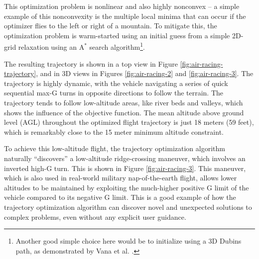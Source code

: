 This optimization problem is nonlinear and also highly nonconvex -- a simple example of this nonconvexity is the multiple local minima that can occur if the optimizer flies to the left or right of a mountain. To mitigate this, the optimization problem is warm-started using an initial guess from a simple 2D-grid relaxation using an $\mathrm{A}^*$ search algorithm\footnote{Another good simple choice here would be to initialize using a 3D Dubins path, as demonstrated by Vana et al. \cite{vana20minimal}.}.

The resulting trajectory is shown in a top view in Figure \ref{fig:air-racing-trajectory}, and in 3D views in Figures \ref{fig:air-racing-2} and \ref{fig:air-racing-3}. The trajectory is highly dynamic, with the vehicle navigating a series of quick sequential max-G turns in opposite directions to follow the terrain. The trajectory tends to follow low-altitude areas, like river beds and valleys, which shows the influence of the objective function. The mean altitude above ground level (AGL) throughout the optimized flight trajectory is just 18 meters (59 feet), which is remarkably close to the 15 meter minimum altitude constraint.

To achieve this low-altitude flight, the trajectory optimization algorithm naturally ``discovers'' a low-altitude ridge-crossing maneuver, which involves an inverted high-G turn. This is shown in Figure \ref{fig:air-racing-3}. This maneuver, which is also used in real-world military nap-of-the-earth flight, allows lower altitudes to be maintained by exploiting the much-higher positive G limit of the vehicle compared to its negative G limit. This is a good example of how the trajectory optimization algorithm can discover novel and unexpected solutions to complex problems, even without any explicit user guidance.

